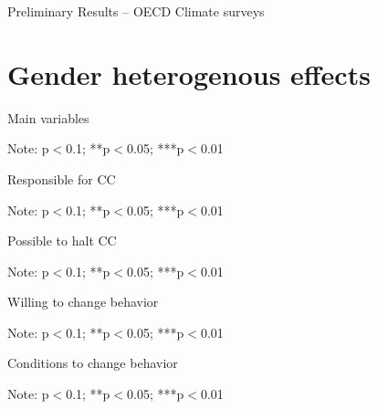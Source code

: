 \documentclass{article}
\begin{document}
\begin{LARGE}
	\begin{center}
		Preliminary Results – OECD Climate surveys	
	\end{center}
	
\end{LARGE}
	\tableofcontents
	\listoftables

\clearpage

\section{Gender heterogenous effects}


\begin{table}[h!]
	\caption{Main variables}
	\begin{center}
		\scalebox{0.7}{}
	\end{center}
	{\footnotesize Note: 
	\newline *p$<$0.1; **p$<$0.05; ***p$<$0.01}
\end{table}	


\begin{table}[h!]
	\caption{Responsible for CC}
	\begin{center}
		\scalebox{0.7}{}
	\end{center}
	{\footnotesize Note: 
	\newline *p$<$0.1; **p$<$0.05; ***p$<$0.01}
\end{table}	

\begin{table}[h!]
	\caption{Possible to halt CC}
	\begin{center}
		\scalebox{0.7}{}
	\end{center}
	{\footnotesize Note: 
	\newline *p$<$0.1; **p$<$0.05; ***p$<$0.01}
\end{table}	

\begin{table}[h!]
	\caption{Willing to change behavior}
	\begin{center}
		\scalebox{0.7}{}
	\end{center}
	{\footnotesize Note: 
	\newline *p$<$0.1; **p$<$0.05; ***p$<$0.01}
\end{table}	

\begin{table}[h!]
	\caption{Conditions to change behavior}
	\begin{center}
		\scalebox{0.7}{}
	\end{center}
	{\footnotesize Note: 
	\newline *p$<$0.1; **p$<$0.05; ***p$<$0.01}
\end{table}	
\end{document}
